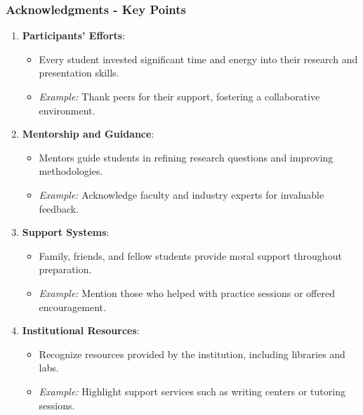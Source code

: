 \documentclass[aspectratio=169]{beamer}
\begin{document}
\begin{frame}[fragile]
    \frametitle{Acknowledgments - Key Points}
    \begin{enumerate}
        \item \textbf{Participants' Efforts}:
        \begin{itemize}
            \item Every student invested significant time and energy into their research and presentation skills.
            \item \textit{Example:} Thank peers for their support, fostering a collaborative environment.
        \end{itemize}

        \item \textbf{Mentorship and Guidance}:
        \begin{itemize}
            \item Mentors guide students in refining research questions and improving methodologies.
            \item \textit{Example:} Acknowledge faculty and industry experts for invaluable feedback.
        \end{itemize}

        \item \textbf{Support Systems}:
        \begin{itemize}
            \item Family, friends, and fellow students provide moral support throughout preparation.
            \item \textit{Example:} Mention those who helped with practice sessions or offered encouragement.
        \end{itemize}

        \item \textbf{Institutional Resources}:
        \begin{itemize}
            \item Recognize resources provided by the institution, including libraries and labs.
            \item \textit{Example:} Highlight support services such as writing centers or tutoring sessions.
        \end{itemize}
    \end{enumerate}
\end{frame}
\end{document}
